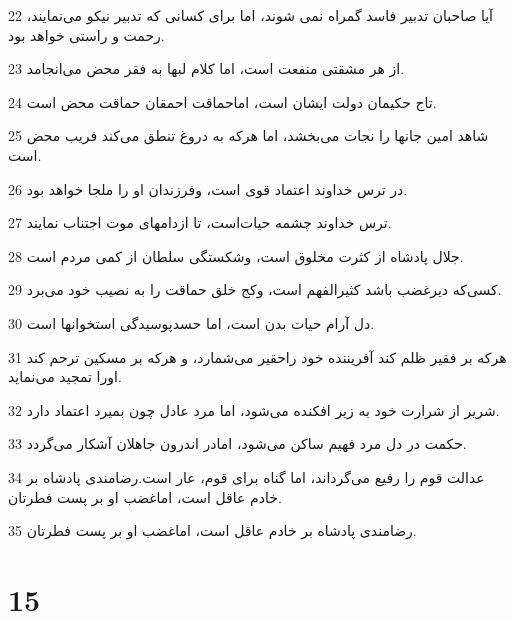 \par 22 آیا صاحبان تدبیر فاسد گمراه نمی شوند، اما برای کسانی که تدبیر نیکو می‌نمایند، رحمت و راستی خواهد بود.
\par 23 از هر مشقتی منفعت است، اما کلام لبها به فقر محض می‌انجامد.
\par 24 تاج حکیمان دولت ایشان است، اماحماقت احمقان حماقت محض است.
\par 25 شاهد امین جانها را نجات می‌بخشد، اما هرکه به دروغ تنطق می‌کند فریب محض است.
\par 26 در ترس خداوند اعتماد قوی است، وفرزندان او را ملجا خواهد بود.
\par 27 ترس خداوند چشمه حیات‌است، تا ازدامهای موت اجتناب نمایند.
\par 28 جلال پادشاه از کثرت مخلوق است، وشکستگی سلطان از کمی مردم است.
\par 29 کسی‌که دیرغضب باشد کثیرالفهم است، وکج خلق حماقت را به نصیب خود می‌برد.
\par 30 دل آرام حیات بدن است، اما حسدپوسیدگی استخوانها است.
\par 31 هر‌که بر فقیر ظلم کند آفریننده خود راحقیر می‌شمارد، و هر‌که بر مسکین ترحم کند اورا تمجید می‌نماید.
\par 32 شریر از شرارت خود به زیر افکنده می‌شود، اما مرد عادل چون بمیرد اعتماد دارد.
\par 33 حکمت در دل مرد فهیم ساکن می‌شود، امادر اندرون جاهلان آشکار می‌گردد.
\par 34 عدالت قوم را رفیع می‌گرداند، اما گناه برای قوم، عار است.رضامندی پادشاه بر خادم عاقل است، اماغضب او بر پست فطرتان.
\par 35 رضامندی پادشاه بر خادم عاقل است، اماغضب او بر پست فطرتان.
 
\chapter{15}

